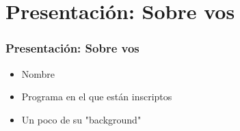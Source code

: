 \documentclass[
  shownotes,
  xcolor={svgnames},
  hyperref={colorlinks,citecolor=DarkBlue,linkcolor=DarkRed,urlcolor=DarkBlue}
  , aspectratio=169]{beamer}
\begin{document}
\section{Presentación: Sobre vos}
\begin{frame}
\frametitle{Presentación: Sobre vos}

    \begin{itemize}
      \item Nombre
      \bigskip
      \item Programa en el que están inscriptos
      \bigskip
      \item Un poco de su "background" 
      \bigskip
    \end{itemize}
\end{frame}
\end{document}
